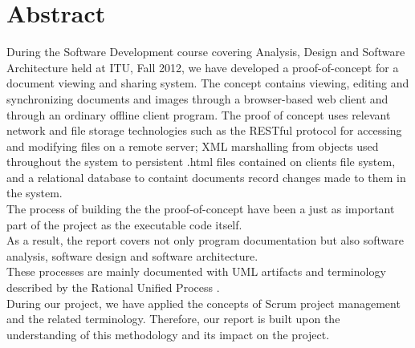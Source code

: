 \section{Abstract}
During the Software Development course covering Analysis, Design and Software Architecture held at ITU, Fall 2012, we have developed a proof-of-concept for a document viewing and sharing system. The concept contains viewing, editing and synchronizing documents and images through a browser-based web client and through an ordinary offline client program. 
The proof of concept uses relevant network and file storage technologies such as the RESTful protocol for accessing and modifying files on a remote server; XML marshalling from objects used throughout the system to persistent .html files contained on clients  file system, and a relational database to containt documents record changes made to them in the system.\\
\newline
The process of building the the proof-of-concept have been a just as important part of the project as the executable code itself.\\
As a result, the report covers not only program documentation but also software analysis, software design and software architecture. \\
These processes are mainly documented with UML artifacts and terminology described by the Rational Unified Process
 \cite[p.~38]{OOAD}.\\
\newline
During our project, we have applied the concepts of Scrum project management and the related terminology. Therefore, our report is built upon the understanding of this methodology and its impact on the project.
\newpage